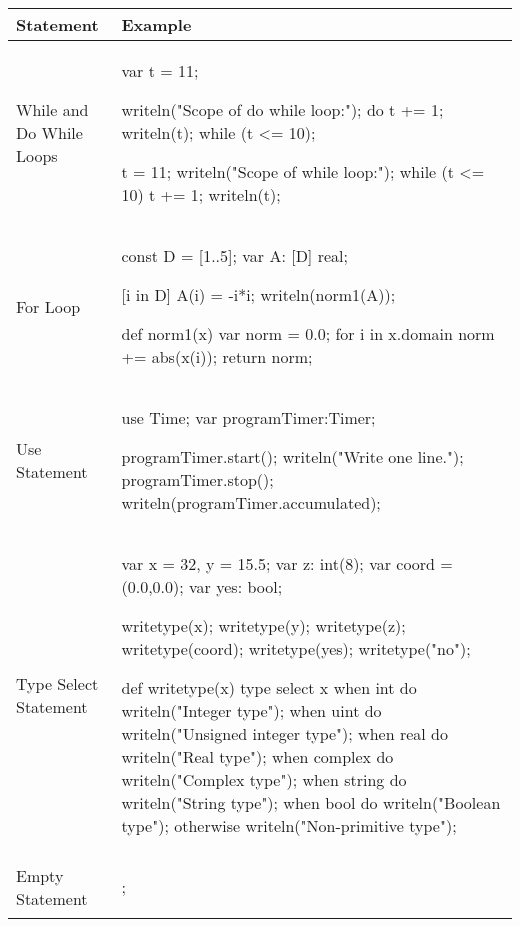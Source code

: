 \begin{center}
\begin{tabular}{|l|l|}
\hline
{\bf Statement} & {\bf Example} \\
\hline
While and Do While Loops &
\begin{chapel} %
var t = 11;

writeln("Scope of do while loop:");
do {
  t += 1;
  writeln(t);
} while (t <= 10);

t = 11;
writeln("Scope of while loop:");
while (t <= 10) {
  t += 1;
  writeln(t);
}
\end{chapel} \\
\hline
For Loop &
\begin{chapel} %
const D = [1..5];
var A: [D] real;

[i in D] A(i) = -i*i;
writeln(norm1(A));

def norm1(x) {
  var norm = 0.0;
  for i in x.domain {
    norm += abs(x(i));
  }
  return norm;
}
\end{chapel} \\
\hline
Use Statement &
\begin{chapel} %
use Time;
var programTimer:Timer;

programTimer.start();
writeln("Write one line.");
programTimer.stop();
writeln(programTimer.accumulated);
\end{chapel} \\
\hline
Type Select Statement &
\begin{chapel} %
var x = 32, y = 15.5;
var z: int(8);
var coord = (0.0,0.0);
var yes: bool;

writetype(x);
writetype(y);
writetype(z);
writetype(coord);
writetype(yes);
writetype("no");

def writetype(x) {
  type select x {
    when int do writeln("Integer type");
    when uint do writeln("Unsigned integer type");
    when real do writeln("Real type");
    when complex do writeln("Complex type");
    when string do writeln("String type");
    when bool do writeln("Boolean type");
    otherwise writeln("Non-primitive type");
  }
}
\end{chapel} \\
\hline
Empty Statement &
\begin{chapel}
;
\end{chapel} \\
\hline
\end{tabular}
\end{center}

